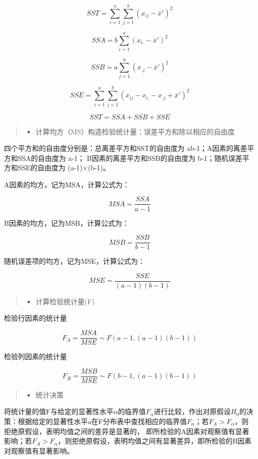 \documentclass[]{ctexbook}
\providecommand{\tightlist}{%
  \setlength{\itemsep}{0pt}\setlength{\parskip}{0pt}}
\begin{document}
\[SST=\sum_{i=1}^a\sum_{j=1}^b(x_{ij}-\bar x')^2\]

\[SSA=b\sum_{i=1}^a(x_{i.}-\bar x')^2\]

\[SSB=a\sum_{j=1}^b(x_{.j}-\bar x')^2\]

\[SSE=\sum_{i=1}^a\sum_{j=1}^b(x_{ij}-x_{i.}-x_{.j}+\bar x')^2\]

\[SST=SSA+SSB+SSE\]

\begin{quote}
\begin{itemize}
\tightlist
\item
  计算均方（MS）构造检验统计量：误差平方和除以相应的自由度
\end{itemize}
\end{quote}

四个平方和的自由度分别是：总离差平方和SST的自由度为 ab-1；A因素的离差平方和SSA的自由度为 a-1；
B因素的离差平方和SSB的自由度为 b-1；随机误差平方和SSE的自由度为 (a-1)×(b-1)。

A因素的均方，记为MSA，计算公式为：

\[MSA=\frac{SSA}{a-1}\]

B因素的均方，记为MSB，计算公式为：

\[MSB=\frac{SSB}{b-1}\]

随机误差项的均方，记为MSE，计算公式为：

\[MSE=\frac{SSE}{(a-1)(b-1)}\]

\begin{quote}
\begin{itemize}
\tightlist
\item
  计算检验统计量(F)
\end{itemize}
\end{quote}

检验行因素的统计量

\[F_A=\frac{MSA}{MSE}\sim F(a-1,(a-1)(b-1))\]

检验列因素的统计量

\[F_B=\frac{MSB}{MSE}\sim F(b-1,(a-1)(b-1))\]

\begin{quote}
\begin{itemize}
\tightlist
\item
  统计决策
\end{itemize}
\end{quote}

将统计量的值F与给定的显著性水平\(\alpha\)的临界值\(F_\alpha\)进行比较，作出对原假设\(H_0\)的决策：根据给定的显著性水平a在F分布表中查找相应的临界值\(F_\alpha\)；若\(F_A>F_\alpha\)，则拒绝原假设，表明均值之间的差异是显著的， 即所检验的A因素对观察值有显著影响；若\(F_A>F_\alpha\)，则拒绝原假设，表明均值之间有显著差异，即所检验的B因素对观察值有显著影响。
\end{document}
